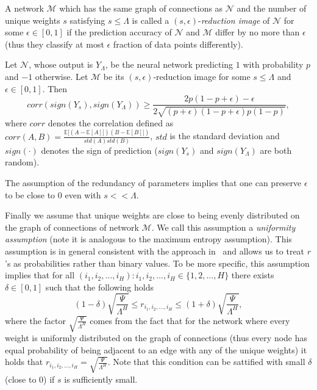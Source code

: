 \documentclass[twoside]{article}
\begin{document}
\begin{definition}
A network $\mathcal{M}$ which has the same graph of connections as $\mathcal{N}$ and the number of unique weights $s$ satisfying $s \leq \Lambda$ is called a $(s,\epsilon)$-\textit{reduction image} of $\mathcal{N}$ for some $\epsilon \in [0,1]$ if the prediction accuracy of $\mathcal{N}$ and $\mathcal{M}$ differ by no more than $\epsilon$ (thus they classify at most $\epsilon$ fraction of data points differently).
\end{definition}

\begin{theorem}
Let $\mathcal{N}$, whose output is $Y_{\Lambda}$, be the neural network predicting $1$ with probability $p$ and $-1$ otherwise. Let $\mathcal{M}$ be its $(s,\epsilon)$-reduction image for some $s \leq \Lambda$ and $\epsilon \in [0,1]$. Then
\[corr(sign(Y_s),sign(Y_{\Lambda})) \geq \frac{2p(1 \!-\! p \!+\! \epsilon) \!-\! \epsilon}{2\sqrt{(p \!+\! \epsilon)(1 \!-\! p \!+\! \epsilon)p(1 \!-\! p)}},
\]
where $corr$ denotes the correlation defined as $corr(A,B) = \frac{\mathbb{E}[(A - \mathbb{E}[A]])(B - \mathbb{E}[B]])}{std(A)std(B)}$, $std$ is the standard deviation and $sign(\cdot)$ denotes the sign of prediction ($sign(Y_s)$ and $sign(Y_{\Lambda})$ are both random).
\label{thm:redun}
\end{theorem}

The assumption of the redundancy of parameters implies that one can preserve $\epsilon$ to be close to $0$ even with $s << \Lambda$. 

Finally we assume that unique weights are close to being evenly distributed on the graph of connections of network $\mathcal{M}$. We call this assumption a \textit{uniformity assumption} (note it is analogous to the maximum entropy assumption). This assumption is in general consistent with the approach in~\cite{NIPS2013_5025} and allows us to treat $r$'s as probabilities rather than binary values. To be more specific, this assumption implies that for all $(i_1,i_2,\dots,i_H):i_1,i_2,\dots,i_H \in \{1,2,\dots,H\}$ there exists $\delta \in [0,1]$ such that the following holds
\begin{equation}
(1-\delta)\sqrt{\frac{\Psi}{\Lambda^H}} \leq r_{i_1,i_2,\dots,i_H} \leq (1+\delta)\sqrt{\frac{\Psi}{\Lambda^H}},
\label{eq:uniform}
\end{equation}
where the factor $\sqrt{\frac{\Psi}{\Lambda^H}}$ comes from the fact that for the network where every weight is uniformly distributed on the graph of connections (thus every node has equal probability of being adjacent to an edge with any of the unique weights) it holds that $r_{i_1,i_2,\dots,i_H} = \sqrt{\frac{\Psi}{\Lambda^H}}$. Note that this condition can be sattified with small $\delta$ (close to $0$) if $s$ is sufficiently small.
\end{document}
